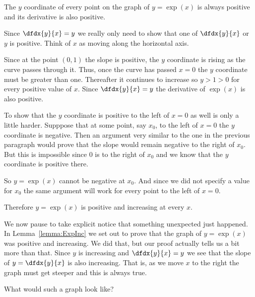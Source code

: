 \begin{mylemma}
  \label{lemma:ExpInc}
  The $y$ coordinate of every point on the graph of $y=\exp(x)$ is
  always positive and its derivative is also positive. 
\end{mylemma}
\begin{myproof}
  Since $\dfdx{y}{x}=y$ we really only need to show that one of
  $\dfdx{y}{x}$ or $y$ is positive. Think of $x$ as moving along the
  horizontal axis.
  
Since at the point $(0,1)$ the slope is positive, the $y$
  coordinate is rising as the curve passes through it. Thus, once
  the curve has passed $x=0$ the $y$ coordinate must be greater than
  one. Thereafter it continues to increase so $y>1>0$ for every
  positive value of $x.$ Since $\dfdx{y}{x}=y$ the derivative of
  $\exp(x)$ is also positive.

  To show that the $y$ coordinate is positive to the left of $x=0$ as
  well is only a little harder.  Supppose that at
  some point, say $x_0$, to the left of $x=0$ the $y$ coordinate is
  negative. Then an argument very similar to the one in the previous
  paragraph would prove that the slope would remain negative to the
  right of $x_0$. But this is impossible since $0$ is to the right of
  $x_0$ and we know that the $y$ coordinate is positive there.

   So $y=\exp(x)$ cannot be negative at $x_0.$ And since we did not
   specify a value for $x_0$ the same argument will work for every
   point to the left of $x=0.$

   Therefore $y=\exp(x)$ is positive and increasing at every $x.$
    \end{myproof}

    We now pause to take explicit notice that something unexpected
    just happened. In Lemma~\ref{lemma:ExpInc} we set out to prove
    that the graph of $y=\exp(x)$ was positive and increasing. We did
    that, but our proof actually tells us a bit more than that. Since
    $y$ is increasing and $\dfdx{y}{x}=y$ we see that the slope of
    $y=\dfdx{y}{x}$ is also increasing. That is, as we move $x$ to the
    right the graph must get steeper and this is always true.
    \begin{ProficiencyDrill}
      What would such a graph look like?
    \end{ProficiencyDrill}
    


